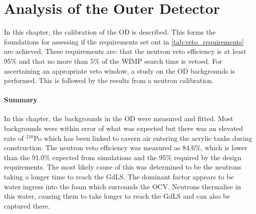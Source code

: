 \chapter{Analysis of the Outer Detector} \label{chap:analysis_of_the_od}

\par
In this chapter, the calibration of the OD is described.
This forms the foundations for assessing if the requirements set out in \autoref{tab:veto_requirements} are achieved.
These requirements are: that the neutron veto efficiency is at least 95\% and that no more than 5\% of the WIMP search time is vetoed.
For ascertaining an appropriate veto window, a study on the OD backgrounds is performed. 
This is followed by the results from a neutron calibration.



\clearpage

\clearpage


%

\subsubsection*{Summary}
\par
In this chapter, the backgrounds in the OD were measured and fitted.
Most backgrounds were within error of what was expected but there was an elevated rate of ${}^{210}$Po which has been linked to cavern air entering the acrylic tanks during construction.
The neutron veto efficiency was measured as 84.6\%, which is lower than the 91.0\% expected from simulations and the 95\% required by the design requirements.
The most likely cause of this was determined to be the neutrons taking a longer time to reach the GdLS.
The dominant factor appears to be water ingress into the foam which surrounds the OCV.
Neutrons thermalise in this water, causing them to take longer to reach the GdLS and can also be captured there.